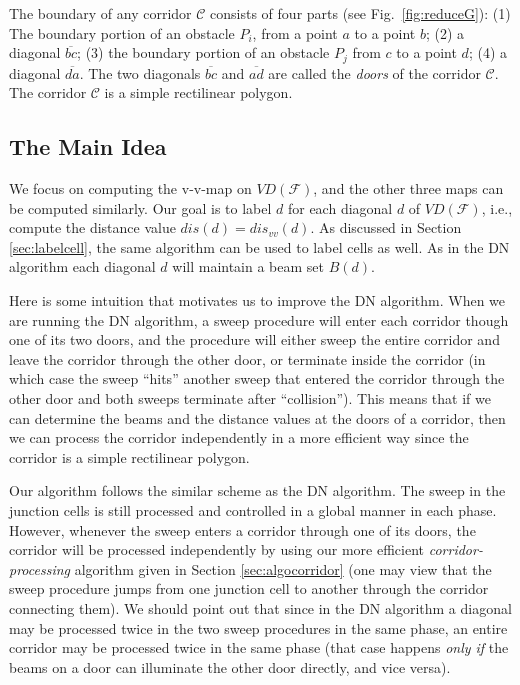 \documentclass[english,runningheads,11pt]{llncs-revised}
\def\calF{\mathcal{F}}
\def\calC{\mathcal{C}}
\newcommand{\vtd}{\mbox{$V\!D$}}
\begin{document}
The boundary of any corridor $\calC$ consists of four parts (see
Fig.~\ref{fig:reduceG}): (1) The boundary portion of an obstacle $P_i$, from
a point $a$ to a point $b$; (2) a diagonal $\overline{bc}$; (3) the
boundary portion of an obstacle $P_j$ from $c$ to a point $d$; (4) a
diagonal $\overline{da}$.  The two diagonals $\overline{bc}$
and $\overline{ad}$ are called the {\em doors} of the corridor $\calC$.
The corridor $\calC$ is a simple rectilinear polygon.



\subsection{The Main Idea}
\label{sec:main}

We focus on computing the v-v-map on $\vtd(\calF)$, and
the other three maps can be computed similarly.
Our goal is to label $d$ for each diagonal $d$ of $\vtd(\calF)$, i.e., compute the
distance value $dis(d)=dis_{vv}(d)$.
As discussed in Section \ref{sec:labelcell}, the same algorithm
can be used to label cells as well. As in the DN algorithm
each diagonal $d$ will maintain a beam set $B(d)$.




Here is some intuition that motivates us to improve the DN algorithm.
When we are running the DN algorithm, a sweep
procedure will enter each corridor though one of its two doors, and the
procedure will either sweep the entire corridor and leave the corridor
through the other door, or terminate inside the corridor (in which case
the sweep ``hits'' another sweep that entered the corridor through the
other door and both sweeps terminate after ``collision'').  This means that if we can
determine the beams and the distance values at the doors of a corridor,
then we can process the corridor independently in a more efficient way since
the corridor is a simple rectilinear polygon.


Our algorithm follows the similar scheme as the DN algorithm. The
sweep in the junction cells is still processed and
controlled in a global manner in each phase.
However, whenever the sweep enters a corridor through one of its doors, the corridor will
be processed independently by using our more efficient {\em
corridor-processing} algorithm given in Section \ref{sec:algocorridor}
(one may view that the sweep procedure jumps from one junction cell to
another through the corridor connecting them).
We should point out that since
in the DN algorithm a diagonal may be processed twice in the two
sweep procedures in the same phase, an entire corridor may be processed twice in
the same phase (that case happens {\em only if} the beams on a door
can illuminate the other door directly, and vice versa).
\end{document}
